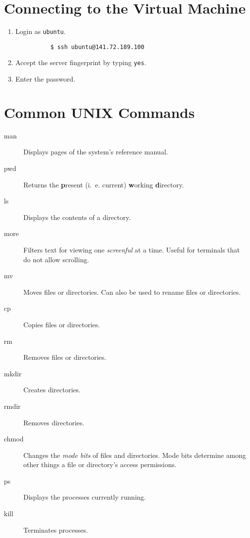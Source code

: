 
\section{Connecting to the Virtual Machine}

\begin{enumerate}
  \item Login as \texttt{ubuntu}.

        \begin{verbatim}
          $ ssh ubuntu@141.72.189.100
        \end{verbatim}

  \item Accept the server fingerprint by typing \texttt{yes}.
  \item Enter the password.
\end{enumerate}

\section{Common UNIX Commands}

\begin{description}
  \item[man] Displays pages of the system's reference manual.
  \item[pwd] Returns the \textbf{p}resent (i.~e. current) \textbf{w}orking \textbf{d}irectory.
  \item[ls] Displays the contents of a directory.
  \item[more] Filters text for viewing one \emph{screenful} at a time. Useful for terminals that do not allow scrolling.
  \item[mv] Moves files or directories. Can also be used to rename files or directories.
  \item[cp] Copies files or directories.
  \item[rm] Removes files or directories.
  \item[mkdir] Creates directories.
  \item[rmdir] Removes directories.
  \item[chmod] Changes the \emph{mode bits} of files and directories. Mode bits determine among other things a file or directory's access permissions.
  \item[ps] Displays the processes currently running.
  \item[kill] Terminates processes.
\end{description}

